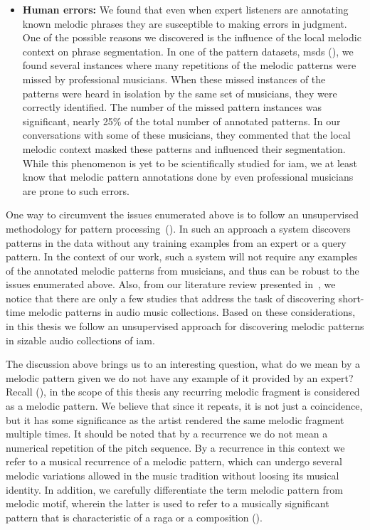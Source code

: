 \begin{itemize}
	\item \textbf{Human errors:} We found that even when expert listeners are annotating known melodic phrases they are susceptible to making errors in judgment. One of the possible reasons we discovered is the influence of the local melodic context on phrase segmentation. In one of the pattern datasets, \acrshort{msds} (), we found several instances where many repetitions of the melodic patterns were missed by professional musicians. When these missed instances of the patterns were heard in isolation by the same set of musicians, they were correctly identified. The number of the missed pattern instances was significant, nearly 25\% of the total number of annotated patterns. In our conversations with some of these musicians, they commented that the local melodic context masked these patterns and influenced their segmentation. While this phenomenon is yet to be scientifically studied for \gls{iam}, we at least know that melodic pattern annotations done by even professional musicians are prone to such errors. 			
\end{itemize}

One way to circumvent the issues enumerated above is to follow an unsupervised methodology for pattern processing~(). In such an approach a system discovers patterns in the data without any training examples from an expert or a query pattern. In the context of our work, such a system will not require any examples of the annotated melodic patterns from musicians, and thus can be robust to the issues enumerated above. Also, from our literature review presented in~, we notice that there are only a few studies that address the task of discovering short-time melodic patterns in audio music collections. Based on these considerations, in this thesis we follow an unsupervised approach for discovering melodic patterns in sizable audio collections of \gls{iam}. 

The discussion above brings us to an interesting question, what do we mean by a melodic pattern given we do not have any example of it provided by an expert? Recall (), in the scope of this thesis any recurring melodic fragment is considered as a melodic pattern. We believe that since it repeats, it is not just a coincidence, but it has some significance as the artist rendered the same melodic fragment multiple times. It should be noted that by a recurrence we do not mean a numerical repetition of the pitch sequence. By a recurrence in this context we refer to a musical recurrence of a melodic pattern, which can undergo several melodic variations allowed in the music tradition without loosing its musical identity. In addition, we carefully differentiate the term melodic pattern from melodic motif, wherein the latter is used to refer to a musically significant pattern that is characteristic of a \gls{raga} or a composition (). 

